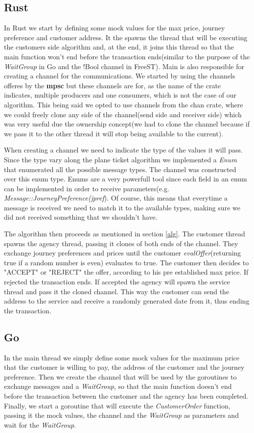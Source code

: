 \documentclass[runningheads]{llncs}
\begin{document}
\subsection{Rust}
In Rust we start by defining some mock values for the max price, journey preference and customer address. It the spawns the thread that will be executing the customers side algorithm and, at the end, it joins this thread so that the main function won't end before the transaction ends(similar to the purpose of the {\it WaitGroup} in Go and the !Bool channel in FreeST). Main is also responsible for creating a channel for the communications. We started by using the channels offeres by the {\bf mpsc} but these channels are for, as the name of the crate indicates, multiple producers and one consumers, which is not the case of our algorithm. This being said we opted to use channels from the chan crate, where we could freely clone any side of the channel(send side and receiver side) which was very useful due the ownership concept(we had to clone the channel because if we pass it to the other thread it will stop being available to the current).

When creating a channel we need to indicate the type of the values it will pass. Since the type vary along the plane ticket algorithm we implemented a {\it Enum} that enumerated all the possible message types. The channel was constructed over this enum type. Enums are a very powerfull tool since each field in an enum can be implemented in order to receive parameters(e.g. {\it Message::JourneyPreference(jpref}). Of course, this means  that everytime a message is received we need to match it to the available types, making sure we did not received something that we shouldn't have.

The algorithm then proceeds as mentioned in section \ref{alg}. The customer thread spawns the agency thread, passing it clones of both ends of the channel. They exchange journey preferences and prices until the customer {\it evalOffer}(returning true if a random number is even) evaluates to true. The customer then decides to "ACCEPT" or "REJECT" the offer, according to his pre established max price. If rejected the transaction ends. If accepted the agency will spawn the service thread and pass it the cloned channel. This way the customer can send the address to the service and receive a randomly generated date from it, thus ending the transaction.
\subsection{Go}
In the main thread we simply define some mock values for the maximum price that the customer is willing to pay, the address of the customer and the journey preference. Then we create the channel that will be used by the goroutines to exchange messages and a {\it WaitGroup}, so that the main function doesn't end before the transaction between the customer and the agency has been completed. Finally, we start a goroutine that will execute the {\it CustomerOrder} function, passing it the mock values, the channel and the {\it WaitGroup} as parameters and wait for the {\it WaitGroup}.
\end{document}
